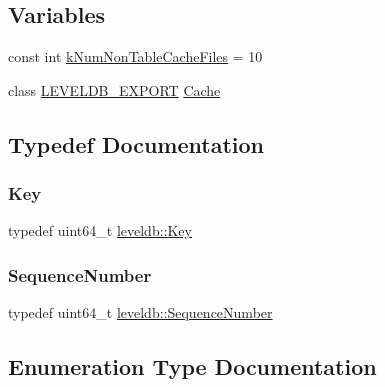 \subsection*{Variables}
\begin{DoxyCompactItemize}
\item 
const int \mbox{\hyperlink{namespaceleveldb_a550686b2c442f4c3011d68dd12c38662}{k\+Num\+Non\+Table\+Cache\+Files}} = 10
\item 
class \mbox{\hyperlink{export_8h_a658cd25b9dd114d894ae8ce9dddb7d3a}{L\+E\+V\+E\+L\+D\+B\+\_\+\+E\+X\+P\+O\+RT}} \mbox{\hyperlink{namespaceleveldb_ac101abd3dff045f25ff9b8aa474e8403}{Cache}}
\end{DoxyCompactItemize}


\subsection{Typedef Documentation}
\mbox{\label{namespaceleveldb_a7e9a9725b13fa0bd922d885280dfab95}} 
\subsubsection{\texorpdfstring{Key}{Key}}
{\footnotesize\ttfamily typedef uint64\+\_\+t \mbox{\hyperlink{namespaceleveldb_a7e9a9725b13fa0bd922d885280dfab95}{leveldb\+::\+Key}}}

\mbox{\label{namespaceleveldb_a5481ededd221c36d652c371249f869fa}} 
\subsubsection{\texorpdfstring{SequenceNumber}{SequenceNumber}}
{\footnotesize\ttfamily typedef uint64\+\_\+t \mbox{\hyperlink{namespaceleveldb_a5481ededd221c36d652c371249f869fa}{leveldb\+::\+Sequence\+Number}}}



\subsection{Enumeration Type Documentation}
\mbox{\label{namespaceleveldb_a047a8e77a76becb82bab4720994f6f9b}} 
